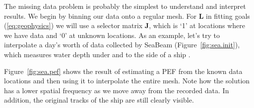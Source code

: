 
The missing data problem is probably the simplest to understand and
interpret results.  
We  begin by binning our data onto a regular mesh.
For $\mathbf{L}$ in fitting goals (\ref{eq:geophysics}) we will use a selector 
matrix $\mathbf{J}$,
which is `1' at locations where we have data and `0' at unknown locations.
As an  example, let's  try to interpolate 
a day's worth of  data
collected by SeaBeam (Figure~\ref{fig:sea.init}), which measures
water depth under and to the side of a  ship \cite{gee}. 


Figure~\ref{fig:sea.pef} shows the result of estimating a PEF from the
known data locations and then using it to interpolate the entire mesh.
Note how the solution has a lower spatial frequency as we move away from
the recorded data. In addition, the original tracks of the ship are still
clearly visible.  


